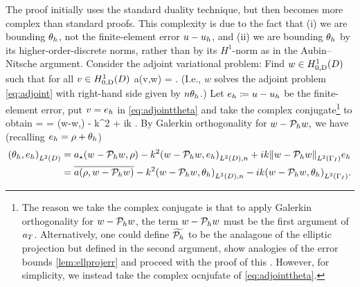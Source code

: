 The proof initially uses the standard duality technique, but then becomes more complex than standard proofs. This complexity is due to the fact that (i) we are bounding $\theta_{h}$, not the finite-element error $u-u_{h}$, and (ii) we are bounding $\theta_{h}$ by its higher-order-discrete norms, rather than by its $H^1$-norm as in the Aubin--Nitsche argument.
Consider the adjoint variational problem: Find $w \in \HozDD$ such that for all $v \in \HozDD$
\beq\label{eq:adjointtheta}
a(v,w) = .
\eeq
(I.e., $w$ solves the adjoint problem \cref{eq:adjoint} with right-hand side given by $n\theta_{h}$.) Let $e_{h} \coloneqq u -u_{h}$ be the finite-element error, put $v = e_{h}$ in \cref{eq:adjointtheta} and take the complex conjugate\footnote{The reason we take the complex conjugate is that to apply Galerkin orthogonality for $w-\mathcal P_{h} w$, the term $w-\mathcal P_{h} w$ must be the first argument of $a_{T}$. Alternatively, one could define $\widetilde{\mathcal P_{h}}$ to be the analagoue of the elliptic projection but defined in the second argument, show analogies of the error bounds \cref{lem:ellprojerr} and proceed with the proof of this . However, for simplicity, we instead take the complex ocnjufate of \cref{eq:adjointtheta}.} to obtain
\beqs
\IPLtD{\thetah}{\eh} =  = \aep(w-\Ph w,\eh) - k^2  + ik .
\eeqs
By Galerkin orthogonality for $w-\mathcal P_{h} w,$ we have (recalling $e_{h} = \rho + \theta_{h}$)
\begin{align}
  \IPLtD{\thetah}{\eh} &= \aep(w-\Ph w,\rho) - k^2 \IPLtDn{w-\Ph w}{\eh} + ik \NLtGI{w - \Ph w}{\eh}\nonumber\\
&= \overline{a(\rho,w-\Ph w)}  -k^2 \IPLtDn{w-\Ph w}{\thetah} -ik \IPLtGI{w-\Ph w}{\thetah}.\label{eq:doublego}
\end{align}

